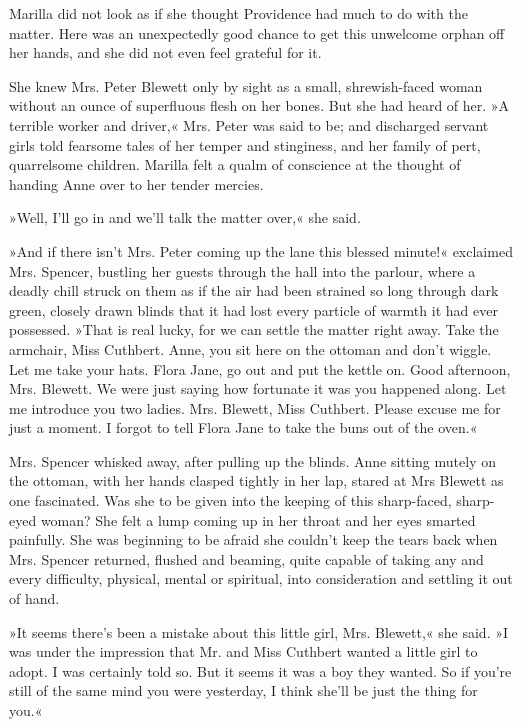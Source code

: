 Marilla did not look as if she thought Providence had much to do with the matter. Here was an unexpectedly good chance to get this unwelcome orphan off her hands, and she did not even feel grateful for it.

She knew Mrs. Peter Blewett only by sight as a small, shrewish-faced woman without an ounce of superfluous flesh on her bones. But she had heard of her. »A terrible worker and driver,« Mrs. Peter was said to be; and discharged servant girls told fearsome tales of her temper and stinginess, and her family of pert, quarrelsome children. Marilla felt a qualm of conscience at the thought of handing Anne over to her tender mercies.

»Well, I’ll go in and we’ll talk the matter over,« she said.

»And if there isn’t Mrs. Peter coming up the lane this blessed minute!« exclaimed Mrs. Spencer, bustling her guests through the hall into the parlour, where a deadly chill struck on them as if the air had been strained so long through dark green, closely drawn blinds that it had lost every particle of warmth it had ever possessed. »That is real lucky, for we can settle the matter right away. Take the armchair, Miss Cuthbert. Anne, you sit here on the ottoman and don’t wiggle. Let me take your hats. Flora Jane, go out and put the kettle on. Good afternoon, Mrs. Blewett. We were just saying how fortunate it was you happened along. Let me introduce you two ladies. Mrs. Blewett, Miss Cuthbert. Please excuse me for just a moment. I forgot to tell Flora Jane to take the buns out of the oven.«

Mrs. Spencer whisked away, after pulling up the blinds. Anne sitting mutely on the ottoman, with her hands clasped tightly in her lap, stared at Mrs Blewett as one fascinated. Was she to be given into the keeping of this sharp-faced, sharp-eyed woman? She felt a lump coming up in her throat and her eyes smarted painfully. She was beginning to be afraid she couldn’t keep the tears back when Mrs. Spencer returned, flushed and beaming, quite capable of taking any and every difficulty, physical, mental or spiritual, into consideration and settling it out of hand.

»It seems there’s been a mistake about this little girl, Mrs. Blewett,« she said. »I was under the impression that Mr. and Miss Cuthbert wanted a little girl to adopt. I was certainly told so. But it seems it was a boy they wanted. So if you’re still of the same mind you were yesterday, I think she’ll be just the thing for you.«

